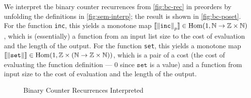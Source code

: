 We interpret the binary counter recurrences from \autoref{fig:bc-rec}
in preorders by unfolding the definitions in
\autoref{fig:sem-interp}; the result is shown in
\autoref{fig:bc-poset}.  For the function \texttt{inc}, this yields a
monotone map $\llbracket \left\lVert\texttt{inc}\right\rVert_p \rrbracket \in \operatorname{Hom}(1,\mathbb{N} \to \mathbb{Z} \times
\mathbb{N})$, which is (essentially) a function from an input list size to the
cost of evaluation and the length of the output.  For the function
\texttt{set}, this yields a monotone map $\llbracket \left\lVert\texttt{set}\right\rVert \rrbracket
\in \operatorname{Hom}(1,\mathbb{Z}\times(\mathbb{N} \to \mathbb{Z} \times \mathbb{N}))$, which is a pair of a cost
(the cost of evaluating the function definition --- $0$ since
$\texttt{set}$ is a value) and a function from input size to the cost of
evaluation and the length of the output.

\begin{figure}
  
  \vspace{-0.2in}
  \caption{Binary Counter Recurrences Interpreted}
  \label{fig:bc-poset}
\end{figure}

